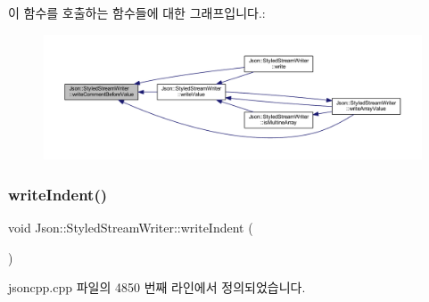이 함수를 호출하는 함수들에 대한 그래프입니다.\+:\nopagebreak
\begin{figure}[H]
\begin{center}
\leavevmode
\includegraphics[width=350pt]{class_json_1_1_styled_stream_writer_a79c3c2b320475035c47b2db484a3e434_icgraph}
\end{center}
\end{figure}
\mbox{\label{class_json_1_1_styled_stream_writer_a5a52fa5b406f1580a61dde3b5638e76d}} 
\subsubsection{\texorpdfstring{write\+Indent()}{writeIndent()}}
{\footnotesize\ttfamily void Json\+::\+Styled\+Stream\+Writer\+::write\+Indent (\begin{DoxyParamCaption}{ }\end{DoxyParamCaption})\hspace{0.3cm}{\ttfamily [private]}}



jsoncpp.\+cpp 파일의 4850 번째 라인에서 정의되었습니다.



